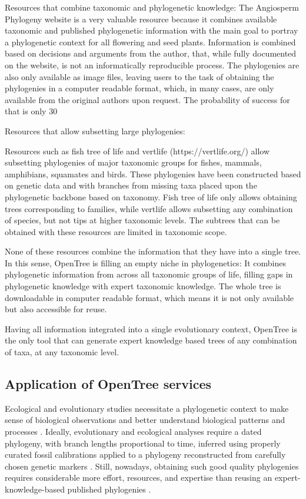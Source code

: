 \documentclass[oupdraft]{sysbio_sse}
\begin{document}
Resources that combine taxonomic and phylogenetic knowledge:
The Angiosperm Phylogeny website \citep{stevens2001angiosperm} is a very valuable resource because it combines
available taxonomic and published phylogenetic information with the main goal to
portray a phylogenetic context for all flowering and seed plants. Information is
combined based on decisions and arguments from the author, that, while fully documented
on the website, is not an informatically reproducible process. The phylogenies are
also only available as image files, leaving users to the task of obtaining the phylogenies
in a computer readable format, which, in many cases, are only available from the
original authors upon request. The probability of success for that is only 30%

Resources that allow subsetting large phylogenies:

Resources such as fish tree of life \citep{chang2019r} and vertlife (https://vertlife.org/)
allow subsetting phylogenies of major taxonomic groups for fishes, mammals, amphibians, squamates and birds.
These phylogenies have been constructed based on genetic data and with branches
from missing taxa placed upon the phylogenetic backbone based on taxonomy. Fish
tree of life only allows obtaining trees corresponding to families, while vertlife
allows subsetting any combination of species, but not tips at higher taxonomic levels.
The subtrees that can be obtained with these resources are limited in taxonomic scope.

None of these resources combine the information that they have into a single tree.
In this sense, OpenTree is filling an empty niche in phylogenetics:
It combines phylogenetic information from across all taxonomic groups of life,
filling gaps in phylogenetic knowledge with expert taxonomic knowledge. The whole
tree is downloadable in computer readable format, which means it is not only available
but also accessible for reuse.

Having all information integrated into a single evolutionary context, OpenTree
is the only tool that can generate expert knowledge based trees of any combination
of taxa, at any taxonomic level.


\subsection{Application of OpenTree services}

Ecological and evolutionary studies necessitate a phylogenetic context to make sense of biological
observations and better understand biological patterns and processes
\citep{felsenstein1985phylogenies, soltis2003role}.
Ideally, evolutionary and ecological analyses require a dated phylogeny, with branch lengths
proportional to time, inferred using properly curated fossil calibrations applied
to a phylogeny reconstructed from carefully chosen genetic markers \citep{webb2008phylocom, jantzen2019effects}.
Still, nowadays, obtaining such good quality phylogenies requires
considerable more effort, resources, and expertise than reusing an expert-knowledge-based
published phylogenies \citep{li2019common}.
\end{document}
